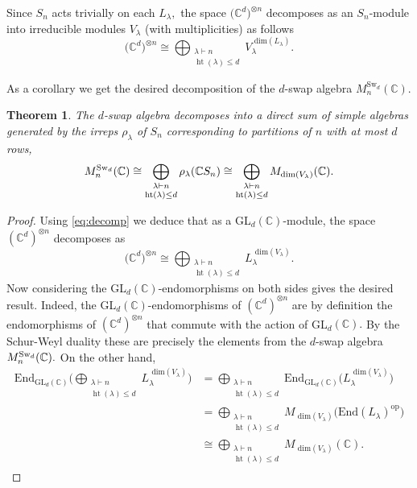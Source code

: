 \documentclass[12pt,dvipsnames,accepted=2016-08-18,a4paper,onecolumn]{quantumarticle}
\renewcommand{\qedsymbol}{\rule[.12ex]{1.2ex}{1.2ex}}
\DeclareMathOperator{\het}{ht}
\numberwithin{equation}{section}
\newcommand{\CC}{\mathbb C}
\newtheorem{theorem}{Theorem}[section]
\theoremstyle{definition}
\begin{document}
Since $S_n$ acts trivially on each $L_\lambda,$ the space $\big(\mathbb{C}^d\big)^{\otimes n}$ decomposes as an $S_n$-module into irreducible modules $V_\lambda$ (with multiplicities) as follows
$$
\big(\mathbb{C}^d\big)^{\otimes n} \cong \bigoplus_{\substack{\lambda\vdash n \\[.5mm] \het(\lambda)\le d}} V_\lambda^{\text{ dim}(L_\lambda)}. 
$$

	
	
	
As a corollary we get the desired decomposition of the $d$-swap algebra $	M^{\text{Sw}_d}_n(\mathbb{C}).$
\begin{theorem}\label{th: s-w-swaps}
	The $d$-swap algebra decomposes into a direct sum of simple algebras generated by the irreps $\rho_\lambda$ of $S_n$ corresponding to partitions of $n$ with at most $d$ rows,
	$$
	M^{\text{\textnormal{Sw}}_d}_n(\mathbb{C}) \cong \bigoplus_{\substack{\lambda\vdash n \\[.5mm] \het(\lambda)\le d}} \rho_{\lambda} (\mathbb{C}S_n) \cong \bigoplus_{\substack{\lambda\vdash n \\[.5mm] \het(\lambda)\le d}}M_{{\rm dim}(V_\lambda)}(\CC).
	$$
\end{theorem}

\begin{proof}
    Using \eqref{eq:decomp} we deduce that as a GL$_d(\CC)$-module, the space  $(\CC^d)^{\otimes n}$ decomposes as
    $$
\big(\mathbb{C}^d\big)^{\otimes n} \cong \bigoplus_{\substack{\lambda\vdash n \\ \het(\lambda)\le d}} L_\lambda^{\text{ dim}(V_\lambda)}. 
$$
Now considering the GL$_d(\CC)$-endomorphisms on both sides gives the desired result. Indeed, the GL$_d(\CC)$-endomorphisms of $(\CC^d)^{\otimes n}$ are by definition the endomorphisms of $(\CC^d)^{\otimes n}$ that commute with the action of GL$_d(\CC).$ By the Schur-Weyl duality these are precisely the elements from the $d$-swap algebra $M^{\text{\textnormal{Sw}}_d}_n(\mathbb{C}) .$ On the other hand, 
\begin{align*}
    \text{End}_{\text{GL}_d(\CC)}\Bigg( \bigoplus_{\substack{\lambda\vdash n \\[.5mm] \het(\lambda)\le d}} L_\lambda^{\text{ dim}(V_\lambda)} \Bigg) &=
 \bigoplus_{\substack{\lambda\vdash n \\[.5mm] \het(\lambda)\le d}} \text{End}_{\text{GL}_d(\CC)} \Big(L_\lambda^{\text{ dim}(V_\lambda)}\Big)\\
 &= \bigoplus_{\substack{\lambda\vdash n \\[.5mm] \het(\lambda)\le d}} M_{\text{ dim}(V_\lambda)} \Big( \text{End}(L_\lambda)^{\text{op}} \Big)\\
 &\cong \bigoplus_{\substack{\lambda\vdash n \\[.5mm] \het(\lambda)\le d}}M_{\text{ dim}(V_\lambda)}(\CC).
 \tag*{\qed}
\end{align*}
\renewcommand{\qedsymbol}{}
\end{proof}
\end{document}
